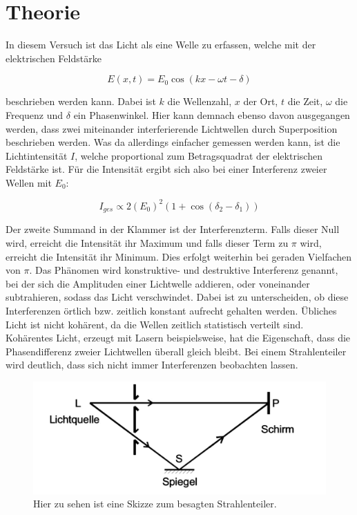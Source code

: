 \section{Theorie}
\label{sec:Theorie}

In diesem Versuch ist das Licht als eine Welle zu erfassen, welche mit der elektrischen Feldstärke 

\begin{equation}
    E(x,t) = E_0 \cos(kx-\omega t - \delta)
\end{equation}

beschrieben werden kann. Dabei ist \(k\) die Wellenzahl, \(x\) der Ort, \(t\) die Zeit, \(\omega\) die Frequenz und \(\delta\) ein Phasenwinkel. Hier kann demnach ebenso davon ausgegangen werden, dass zwei miteinander interferierende Lichtwellen durch Superposition beschrieben werden. Was da allerdings einfacher gemessen werden kann, ist die Lichtintensität \(I\), welche proportional zum Betragsquadrat der elektrischen Feldstärke ist. Für die Intensität ergibt sich also bei einer Interferenz zweier Wellen mit \(E_0\):


\begin{equation}
    I_{ges} \propto 2(E_0)^2(1+\cos(\delta_2 - \delta_1))
\end{equation}

Der zweite Summand in der Klammer ist der Interferenzterm. Falls dieser Null wird, erreicht die Intensität ihr Maximum und falls dieser Term zu \(\pi\) wird, erreicht die Intensität ihr Minimum. Dies erfolgt weiterhin bei geraden Vielfachen von \(\pi\). Das Phänomen wird konstruktive- und destruktive Interferenz genannt, bei der sich die Amplituden einer Lichtwelle addieren, oder voneinander subtrahieren, sodass das Licht verschwindet. Dabei ist zu unterscheiden, ob diese Interferenzen örtlich bzw. zeitlich konstant aufrecht gehalten werden. Übliches Licht ist nicht kohärent, da die Wellen zeitlich statistisch verteilt sind. Kohärentes Licht, erzeugt mit Lasern beispielsweise, hat die Eigenschaft, dass die Phasendifferenz zweier Lichtwellen überall gleich bleibt. Bei einem Strahlenteiler wird deutlich, dass sich nicht immer Interferenzen beobachten lassen. 


\begin{figure}
    \centering
    \includegraphics[scale = 0.3]{content/Strahlenteiler.pdf}
    \caption{Hier zu sehen ist eine Skizze zum besagten Strahlenteiler.}
    \label{fig:Teiler}
\end{figure}

